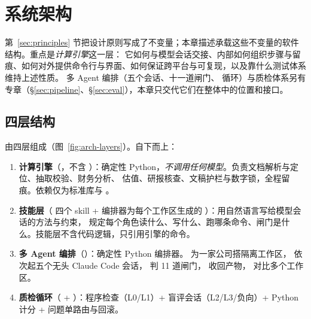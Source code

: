 \section{系统架构}
\label{sec:arch}

\newcommand{\arT}[1]{{\let\arUS\_\def\_{\arUS\allowbreak}\code{#1}}}  %
\sloppy  %

第~\ref{sec:principles} 节把设计原则写成了不变量；本章描述承载这些不变量的软件结构。重点是\emph{计算引擎}这一层：
它如何与模型会话交接、内部如何组织步骤与留痕、如何对外提供命令行与界面、如何保证跨平台与可复现，以及靠什么测试体系维持上述性质。
多 Agent 编排（五个会话、十一道闸门、 循环）与质检体系另有专章（\S\ref{sec:pipeline}、\S\ref{sec:eval}），本章只交代它们在整体中的位置和接口。

\subsection{四层结构}
\label{sec:arch-layers}

\sysname{} 由四层组成（图~\ref{fig:arch-layers}）。自下而上：

\begin{enumerate}
  \item \textbf{计算引擎}（，不含 ）：确定性 Python，\emph{不调用任何模型}。负责文档解析与定位、抽取校验、财务分析、
        估值、研报核查、文稿护栏与数字锁，全程留痕。依赖仅为标准库与 。
  \item \textbf{技能层}（ 四个 skill + 编排器为每个工作区生成的 ）：用自然语言写给模型会话的方法与约束，
        规定每个角色读什么、写什么、跑哪条命令、闸门是什么。技能层不含代码逻辑，只引用引擎的命令。
  \item \textbf{多 Agent 编排}（）：确定性 Python 编排器。 为一家公司搭隔离工作区， 依次起五个无头 Claude Code 会话，
         判 11 道闸门， 收回产物， 对比多个工作区。
  \item \textbf{质检循环}（ + ）：程序检查（L0/L1）+ 盲评会话（L2/L3/负向）+ Python 计分 + 问题单路由与回滚。
\end{enumerate}

